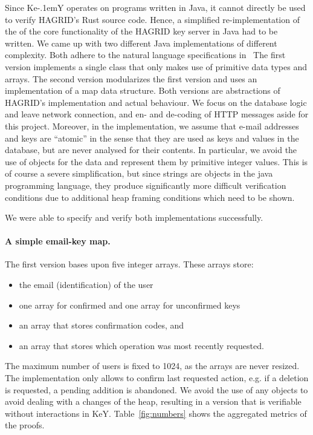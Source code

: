 \documentclass{llncs}
\newcommand{\KeY}{Ke\kern-.1emY\xspace}
\begin{document}
Since \KeY operates on programs written in Java, it cannot directly be
used to verify HAGRID's Rust source code. Hence, a simplified
re-implementation of the of the core functionality of the HAGRID key
server in Java had to be written.
%
We came up with two different Java implementations of different
complexity.
%
Both adhere to the natural language specifications in~\cite{LTC-dok}
%
The first version implements a single class that only
makes use of primitive data types and arrays. The second version
modularizes the first version and uses an implementation of a map data
structure. Both versions are abstractions of HAGRID's implementation
and actual behaviour. We focus on the database logic and leave network
connection, and en- and de-coding of HTTP messages aside for this
project. 
%
Moreover, in the implementation, we assume that e-mail addresses and
keys are ``atomic'' in the sense that they are used as keys and values
in the database, but are never analysed for their contents. In
particular, we avoid the use of objects for the data and represent
them by primitive integer values.
%
This is of course a severe simplification, but since strings are
objects in the java programming language, they produce significantly
more difficult verification conditions due to additional heap framing
conditions which need to be shown.

We were able to specify and verify both implementations successfully.

\paragraph{A simple email-key map.}
%
The first version bases upon five integer arrays.
These arrays store:
%
\begin{itemize}
  \item the email (identification) of the user
  \item one array for confirmed and one array for unconfirmed keys
  \item an array that stores confirmation codes, and
  \item an array that stores which operation was most recently requested.
\end{itemize}
%
The maximum number of users is fixed to 1024, as the arrays are never resized.
The implementation only allows to confirm last requested action, e.g. if a
deletion is requested, a pending addition is abandoned.
%
We avoid the use of any objects to avoid dealing with a changes of the heap,
resulting in a version that is verifiable without interactions in KeY. 
Table~\ref{fig:numbers} shows the aggregated metrics of the proofs.
\end{document}
